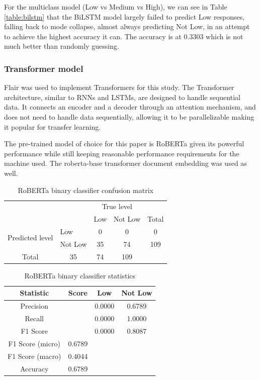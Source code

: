 \documentclass[12pt, a4paper]{article}
\begin{document}
For the multiclass model (Low vs Medium vs High), we can see in Table \ref{table:bilstm} that the BiLSTM model largely failed to predict Low responses, falling back to mode collapse, almost always predicting Not Low, in an attempt to achieve the highest accuracy it can. The accuracy is at 0.3303 which is not much better than randomly guessing.

\subsubsection{Transformer model}

Flair\cite{flair} was used to implement Transformers for this study. The Transformer\cite{vaswani2017attention} architecture, similar to RNNs and LSTMs, are designed to handle sequential data. It connects an encoder and a decoder through an attention mechanism, and does not need to handle data sequentially, allowing it to be parallelizable making it popular for transfer learning.

The pre-trained model of choice for this paper is RoBERTa\cite{roberta} given its powerful performance while still keeping reasonable performance requirements for the machine used. The roberta-base transformer document embedding was used as well.

\begin{table}[ht]
\centering
\begin{tabular}{l|l|c|c|c}
\multicolumn{2}{c}{}&\multicolumn{2}{c}{True level}&\\
\cline{3-4}
\multicolumn{2}{c|}{}&Low&Not Low&\multicolumn{1}{c}{Total}\\
\cline{2-4}
\multirow{2}{*}{Predicted level}& Low & 0 & 0 & 0\\
\cline{2-4}
& Not Low & 35 & 74 & 109\\
\cline{2-4}
\multicolumn{1}{c}{Total} & \multicolumn{1}{c}{35} & \multicolumn{    1}{c}{74} & \multicolumn{1}{c}{109}\\
\end{tabular}
\caption{RoBERTa binary classifier confusion matrix}
\label{table:robertacm_low}
\end{table}

\begin{table}[ht]
\centering
\begin{tabular}{||c c c c||} 
 \hline
 Statistic & Score & Low & Not Low  \\ [0.5ex] 
 \hline\hline
 Precision &  & 0.0000 & 0.6789 \\ 
 Recall & & 0.0000 & 1.0000 \\
 F1 Score &  & 0.0000 & 0.8087 \\
 F1 Score (micro) & 0.6789 & & \\
 F1 Score (macro)  & 0.4044 & &  \\ 
 Accuracy  & 0.6789 & & \\ [1ex] 
 \hline
\end{tabular}
\caption{RoBERTa binary classifier statistics}
\label{table:robertastat_low}
\end{table}
\end{document}
